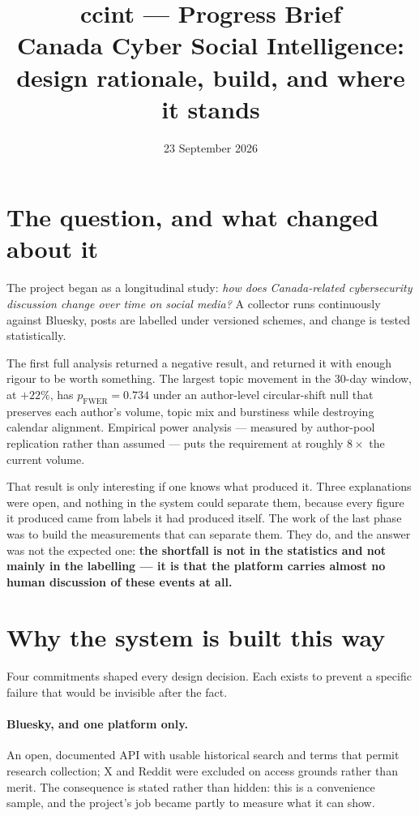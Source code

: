 \documentclass[11pt]{article}
\title{\vspace{-1.7cm}\textbf{\color{accent}ccint --- Progress Brief}\\[3pt]
\large\color{ink} Canada Cyber Social Intelligence: design rationale, build, and
where it stands}
\author{}
\date{\normalsize 23 September 2026}
\begin{document}
\maketitle
\vspace{-1.5cm}

\section*{\color{accent}The question, and what changed about it}

The project began as a longitudinal study: \emph{how does Canada-related
cybersecurity discussion change over time on social media?} A collector runs
continuously against Bluesky, posts are labelled under versioned schemes, and
change is tested statistically.

The first full analysis returned a negative result, and returned it with
enough rigour to be worth something. The largest topic movement in the 30-day
window,  at $+22\%$, has $p_{\mathrm{FWER}} = 0.734$ under
an author-level circular-shift null that preserves each author's volume, topic
mix and burstiness while destroying calendar alignment. Empirical power
analysis --- measured by author-pool replication rather than assumed ---
puts the requirement at roughly $8\times$ the current volume.

That result is only interesting if one knows what produced it. Three
explanations were open, and nothing in the system could separate them, because
every figure it produced came from labels it had produced itself. The work of
the last phase was to build the measurements that can separate them. They do,
and the answer was not the expected one: \textbf{the shortfall is not in the
statistics and not mainly in the labelling --- it is that the platform carries
almost no human discussion of these events at all.}

\section*{\color{accent}Why the system is built this way}

Four commitments shaped every design decision. Each exists to prevent a
specific failure that would be invisible after the fact.

\paragraph{Bluesky, and one platform only.}
An open, documented API with usable historical search and terms that permit
research collection; X and Reddit were excluded on access grounds rather than
merit. The consequence is stated rather than hidden: this is a convenience
sample, and the project's job became partly to measure what it can show.
\end{document}
